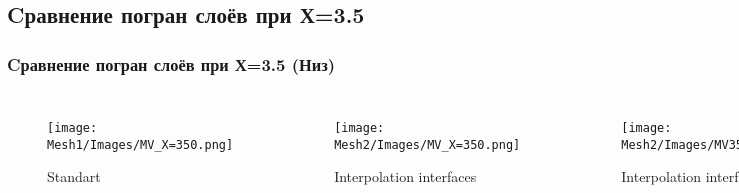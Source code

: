 \documentclass[c, aspectratio = 169]{beamer}
\begin{document}
\subsection{Cравнение погран слоёв при Х=3.5}
\begin{frame}
    \frametitle{Cравнение погран слоёв при Х=3.5 (Низ)}
    \begin{columns}[c] 
        
        \vspace{-0.4cm}
        
            \begin{figure}
                \texttt{[image: Mesh1/Images/MV\_X=350.png]}
                \caption{Standart}    
            \end{figure}   
    
     
        \vspace{-0.4cm}
        
            \begin{figure}
                \texttt{[image: Mesh2/Images/MV\_X=350.png]}
                \caption{Interpolation interfaces}   
            \end{figure}  

        \vspace{-0.4cm}
        
            \begin{figure}
                \texttt{[image: Mesh2/Images/MV35.png]}
                \caption{Interpolation interfaces}   
            \end{figure}  
    \end{columns}
    \end{frame} 





    
\end{document}
